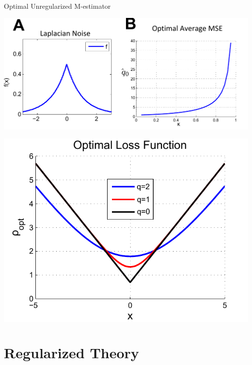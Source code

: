 \documentclass[pdf]{beamer}
\begin{document}
\begin{frame}{Optimal Unregularized M-estimator}


        \begin{center}
            \includegraphics[width = .5\linewidth]{unRegNoiseOpt.pdf}
        \end{center}


        \begin{center}
            \includegraphics[width = .5\linewidth]{opt_loss.pdf}
        \end{center}

\end{frame}

\section{Regularized Theory}
\frame{\sectionpage}
\end{document}
